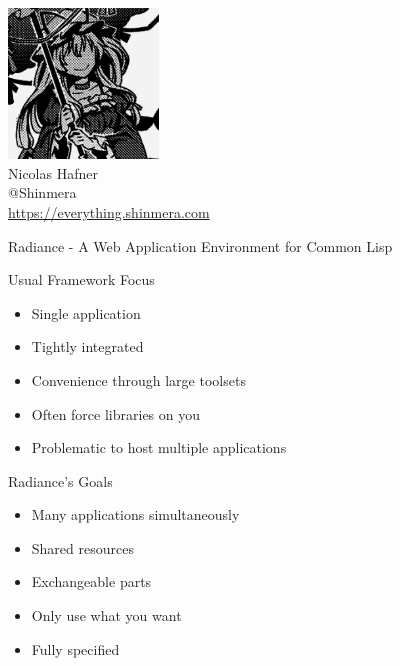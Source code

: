 \documentclass[12pt]{beamer}
\newcommand{\toptitle}[1]{
  {\huge #1} \\
  \vspace{0.2cm}
}
\begin{document}
\begin{frame}
  \begin{center}
    \includegraphics[height=4cm]{avatar.png}\\
    \vspace{0.2cm}
    {\Large Nicolas Hafner} \\
    \vspace{0.2cm}
    {\Huge @Shinmera} \\
    \vspace{0.2cm}
    \url{https://everything.shinmera.com}
  \end{center}
\end{frame}

\begin{frame}
  \toptitle{Radiance - A Web Application Environment for Common Lisp}
\end{frame}

\begin{frame}
  \toptitle{Usual Framework Focus}
  \begin{itemize}
    \item Single application
    \item Tightly integrated
    \item Convenience through large toolsets
      \pause
    \item Often force libraries on you
      \pause
    \item Problematic to host multiple applications
  \end{itemize}
\end{frame}

\begin{frame}
  \toptitle{Radiance's Goals}
  \begin{itemize}
    \item Many applications simultaneously
    \item Shared resources
    \item Exchangeable parts
    \item Only use what you want
      \pause
    \item Fully specified
  \end{itemize}
\end{frame}
\end{document}
